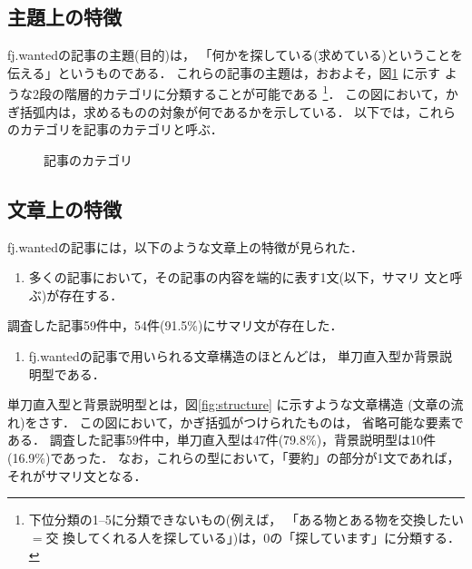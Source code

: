 \subsection{主題上の特徴}

fj.wantedの記事の主題(目的)は，
「何かを探している(求めている)ということを伝える」というものである．
これらの記事の主題は，おおよそ，図\ref{fig:category} に示す
ような2段の階層的カテゴリに分類することが可能である
\footnote{下位分類の1--5に分類できないもの(例えば，
「ある物とある物を交換したい$=$交
換してくれる人を探している」)は，0の「探しています」に分類する．}．
この図において，かぎ括弧内は，求めるものの対象が何であるかを示している．
以下では，これらのカテゴリを記事のカテゴリと呼ぶ．

\begin{figure}
\begin{center} 
\endtree
\end{center}
\caption{記事のカテゴリ}
\label{fig:category}
\end{figure}

\subsection{文章上の特徴}

fj.wantedの記事には，以下のような文章上の特徴が見られた．
\begin{enumerate}
\item[(1)] 多くの記事において，その記事の内容を端的に表す1文(以下，サマリ
文と呼ぶ)が存在する．
\end{enumerate}
調査した記事59件中，54件(91.5\%)にサマリ文が存在した．
\begin{enumerate}
\item[(2)] fj.wantedの記事で用いられる文章構造のほとんどは，
単刀直入型か背景説明型である．
\end{enumerate}
単刀直入型と背景説明型とは，図\ref{fig:structure} に示すような文章構造
(文章の流れ)をさす． この図において，かぎ括弧がつけられたものは，
省略可能な要素である．
調査した記事59件中，単刀直入型は47件(79.8\%)，背景説明型は10件
(16.9\%)であった．
なお，これらの型において，「要約」の部分が1文であれば，
それがサマリ文となる．

